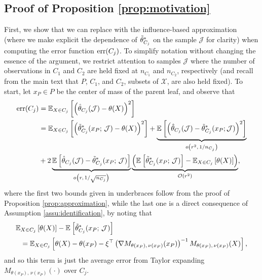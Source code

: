 \documentclass[aos]{imsart}
\theoremstyle{plain}
\theoremstyle{definition}
\theoremstyle{remark}
\begin{document}
\begin{CJK}{UTF8}{gbsn}
\begin{appendix}
\subsection*{Proof of Proposition \ref{prop:motivation}}

First, we show that we can replace  with the influence-based
approximation  (where we make explicit the dependence
of $\tilde{\theta}^*_{C_j}$ on the sample $\mathcal{J}$ for clarity) when computing the error function $\operatorname{err}(C_j)$.  To simplify notation without changing the essence of the argument,
we restrict attention to samples $\mathcal{J}$ where the number of observations in $C_1$ and $C_2$ are held fixed at $n_{C_1}$ and $n_{C_2}$, respectively (and recall from the main text that $P$, $C_1$, and $C_2$, subsets of $\mathcal{X}$, are also held fixed).  To start, let $x_P \in P$ be the center of mass of the parent leaf, and observe that
\begin{equation*}
\begin{split}
\err(C_j) &= \EE[X \in C_j]{\p{\htheta_{C_j}(\mathcal{J}) - \theta(X)}^2} \\
&= \EE[X \in C_j]{\p{\ttheta_{C_j}^*(x_P;\,\mathcal{J}) - \theta(X)}^2} 
 + \underbrace{\EE{\p{\htheta_{C_j}(\mathcal{J}) - \ttheta^*_{C_j}(x_P; \mathcal{J})}^2}}_{o\p{r^2, \, 1/n_{C_j}}} \\
& + 2 \underbrace{\EE{\htheta_{C_j}(\mathcal{J}) - \ttheta^*_{C_j}(x_P;\,\mathcal{J})}}_{o\p{r, \, 1/\sqrt{n_{C_j}}}} 
 \underbrace{\p{\EE{\ttheta_{C_j}^*(x_P;\,\mathcal{J})} - \EE[X \in C_j]{\theta(X)}}}_{\oo\p{r^2}},
\end{split}
\end{equation*}
where the first two bounds given in underbraces follow from the proof of Proposition \ref{prop:approximation},
while the last one is a direct consequence of Assumption \ref{assu:identification}, by noting that
\begin{align*}
&\EE[X \in C_j]{\theta(X)} - \EE{\ttheta_{C_j}^*(x_P;\,\mathcal{J})} \\
& \ \ = \EE[X \in C_j]{\theta(X) - \theta(x_P) - \xi^\top \p{\nabla M_{\theta(x_P), \, \nu(x_P)}(x_P)}^{-1} M_{\theta(x_P), \, \nu(x_P)}(X)},
 \end{align*}
and so this term is just the average error from Taylor expanding $M_{\theta(x_P), \, \nu(x_P)}(\cdot)$
over $C_j$. 

\end{appendix}
\end{CJK}
\end{document}
